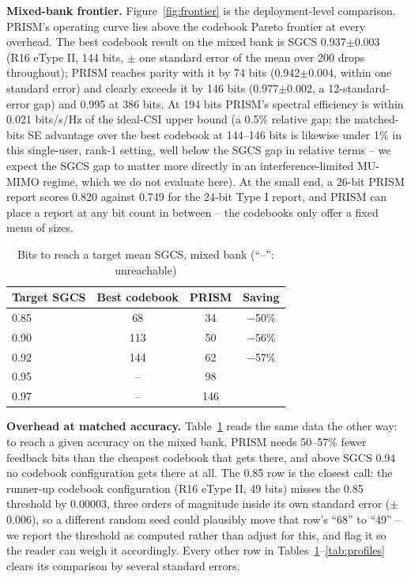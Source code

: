 \documentclass[conference]{IEEEtran}
\begin{document}
\textbf{Mixed-bank frontier.} Figure~\ref{fig:frontier} is the deployment-level comparison. PRISM's operating curve lies above the codebook Pareto frontier at every overhead. The best codebook result on the mixed bank is SGCS 0.937$\pm$0.003 (R16 eType II, 144 bits, $\pm$ one standard error of the mean over 200 drops throughout); PRISM reaches parity with it by 74 bits (0.942$\pm$0.004, within one standard error) and clearly exceeds it by 146 bits (0.977$\pm$0.002, a 12-standard-error gap) and 0.995 at 386 bits. At 194 bits PRISM's spectral efficiency is within 0.021 bits/s/Hz of the ideal-CSI upper bound (a 0.5\% relative gap; the matched-bits SE advantage over the best codebook at 144--146 bits is likewise under 1\% in this single-user, rank-1 setting, well below the SGCS gap in relative terms -- we expect the SGCS gap to matter more directly in an interference-limited MU-MIMO regime, which we do not evaluate here). At the small end, a 26-bit PRISM report scores 0.820 against 0.749 for the 24-bit Type I report, and PRISM can place a report at any bit count in between -- the codebooks only offer a fixed menu of sizes.

\begin{table}[t]
\centering
\caption{Bits to reach a target mean SGCS, mixed bank (``--'': unreachable)}
\label{tab:gain_mixed}
\begin{tabular}{@{}lccc@{}}
\toprule
Target SGCS & Best codebook & PRISM & Saving \\
\midrule
0.85 & 68  & 34  & $-$50\% \\
0.90 & 113 & 50  & $-$56\% \\
0.92 & 144 & 62  & $-$57\% \\
0.95 & --  & 98  & \\
0.97 & --  & 146 & \\
\bottomrule
\end{tabular}
\end{table}

\textbf{Overhead at matched accuracy.} Table~\ref{tab:gain_mixed} reads the same data the other way: to reach a given accuracy on the mixed bank, PRISM needs 50--57\% fewer feedback bits than the cheapest codebook that gets there, and above SGCS 0.94 no codebook configuration gets there at all. The 0.85 row is the closest call: the runner-up codebook configuration (R16 eType II, 49 bits) misses the 0.85 threshold by 0.00003, three orders of magnitude inside its own standard error ($\pm$0.006), so a different random seed could plausibly move that row's ``68'' to ``49'' -- we report the threshold as computed rather than adjust for this, and flag it so the reader can weigh it accordingly. Every other row in Tables~\ref{tab:gain_mixed}--\ref{tab:profiles} clears its comparison by several standard errors.
\end{document}
